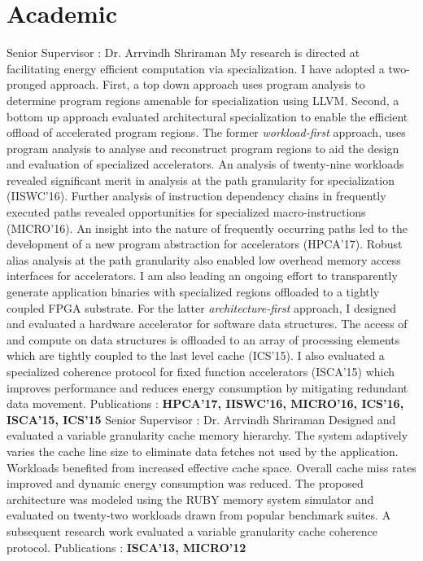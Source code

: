 
\section{Academic}
{Senior Supervisor : Dr. Arrvindh Shriraman \newline{} 
My research is directed at facilitating energy efficient computation via specialization. I have adopted a two-pronged approach. First, a top down approach uses program analysis to determine program regions amenable for specialization using LLVM. Second, a bottom up approach evaluated architectural specialization to enable the efficient offload of accelerated program regions.
\newline{}The former {\em workload-first} approach, uses program analysis to analyse and reconstruct program regions to aid the design and evaluation of specialized accelerators. An analysis of twenty-nine workloads revealed significant merit in analysis at the path granularity for specialization (IISWC'16). Further analysis of instruction dependency chains in frequently executed paths revealed opportunities for specialized macro-instructions (MICRO'16). An insight into the nature of frequently occurring paths led to the development of a new program abstraction for accelerators (HPCA'17). Robust alias analysis at the path granularity also enabled low overhead memory access interfaces for accelerators. I am also leading an ongoing effort to transparently generate application binaries with specialized regions offloaded to a tightly coupled FPGA substrate.
\newline{}For the latter {\em architecture-first} approach, I designed and evaluated a hardware accelerator for software data structures. The access of and compute on data structures is offloaded to an array of processing elements which are tightly coupled to the last level cache (ICS'15). I also evaluated a specialized coherence protocol for fixed function accelerators (ISCA'15) which improves performance and reduces energy consumption by mitigating redundant data movement.
\newline{} Publications : \textbf{HPCA'17, IISWC'16, MICRO'16, ICS'16, ISCA'15, ICS'15}}
\vspace{9pt}
{Senior Supervisor : Dr. Arrvindh Shriraman \newline{} 
Designed and evaluated a variable granularity cache memory hierarchy. The system adaptively varies the cache line size to eliminate data fetches not used by the application. Workloads benefited from increased effective cache space. Overall cache miss rates improved and dynamic energy consumption was reduced. The proposed architecture was modeled using the RUBY memory system simulator and evaluated on twenty-two workloads drawn from popular benchmark suites. A subsequent research work evaluated a variable granularity cache coherence protocol.
\newline{} Publications : \textbf{ISCA'13, MICRO'12}}

